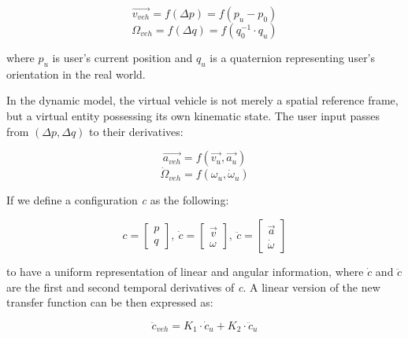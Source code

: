 \begin{equation}
\label{eq:old_tf_t}
\overrightarrow{v_{veh}}=f(\Delta p)=f(p_{u}-p_{0})
\end{equation}
\begin{equation}
\label{eq:old_tf_r}
\Omega_{veh}=f(\Delta q)=f(q_{0}^{-1} \cdot q_{u})
\end{equation}

where $p_{u}$ is user's current position and $q_{u}$ is a quaternion representing user's orientation in the real world.

In the dynamic model, the virtual vehicle is not merely a spatial reference frame, but a virtual entity possessing its own kinematic state. The user input passes from $(\Delta p, \Delta q)$ to their derivatives: 

\begin{equation}
\overrightarrow{a_{veh}}=f(\overrightarrow{v_{u}}, \overrightarrow{a_{u}})
\end{equation}
\begin{equation}
\dot{\Omega}_{veh}=f(\omega_{u}, \dot{\omega}_{u})
\end{equation}

If we define a configuration \textit{c} as the following:

\begin{equation}
c=
\begin{bmatrix}
p \\ q
\end{bmatrix},\:
\dot{c}=
\begin{bmatrix}
\overrightarrow{v} \\ \omega
\end{bmatrix},\:
\ddot{c}=
\begin{bmatrix}
\overrightarrow{a} \\ \dot{\omega}
\end{bmatrix}
\end{equation}

to have a uniform representation of linear and angular information, where $\dot{c}$ and $\ddot{c}$ are the first and second temporal derivatives of \textit{c}. A linear version of the new transfer function can be then expressed as:

\begin{equation}
\ddot{c}_{veh}=K_{1} \cdot \dot{c}_{u} + K_{2} \cdot \ddot{c}_{u}
\end{equation}

